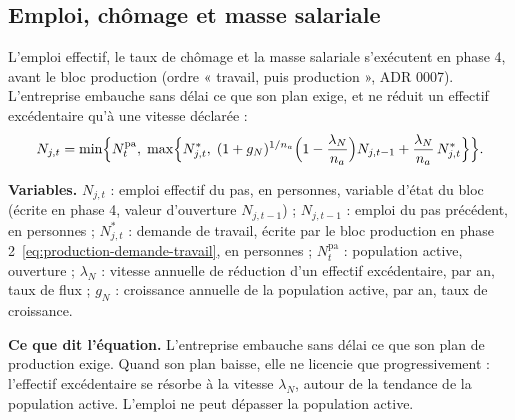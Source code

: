 \documentclass[11pt,a4paper]{article}
\newcommand{\variables}{\par\noindent\textbf{Variables.} }
\newcommand{\sens}{\par\noindent\textbf{Ce que dit l'équation.} }
\begin{document}
\subsection{Emploi, chômage et masse salariale}
\label{sec:travail-emploi}
L'emploi effectif, le taux de chômage et la masse salariale s'exécutent en phase 4, avant le bloc production (ordre « travail, puis production », ADR 0007). L'entreprise embauche sans délai ce que son plan exige, et ne réduit un effectif excédentaire qu'à une vitesse déclarée :
\begin{equation}\label{eq:travail-emploi}
N_{j,t} = \min\Bigl\{N^{\mathrm{pa}}_t,\; \max\Bigl\{N^{\ast}_{j,t},\; (1 + g_N)^{1/n_a}\Bigl(1 - \frac{\lambda_N}{n_a}\Bigr) N_{j,t-1} + \frac{\lambda_N}{n_a}\, N^{\ast}_{j,t}\Bigr\}\Bigr\} .
\end{equation}
\begin{lecture}
\variables $N_{j,t}$ : emploi effectif du pas, en personnes, variable d'état du bloc (écrite en phase 4, valeur d'ouverture $N_{j,t-1}$) ; $N_{j,t-1}$ : emploi du pas précédent, en personnes ; $N^{\ast}_{j,t}$ : demande de travail, écrite par le bloc production en phase 2~\eqref{eq:production-demande-travail}, en personnes ; $N^{\mathrm{pa}}_t$ : population active, ouverture ; $\lambda_N$ : vitesse annuelle de réduction d'un effectif excédentaire, par an, taux de flux ; $g_N$ : croissance annuelle de la population active, par an, taux de croissance.
\sens L'entreprise embauche sans délai ce que son plan de production exige. Quand son plan baisse, elle ne licencie que progressivement : l'effectif excédentaire se résorbe à la vitesse $\lambda_N$, autour de la tendance de la population active. L'emploi ne peut dépasser la population active.

\end{lecture}
\end{document}
